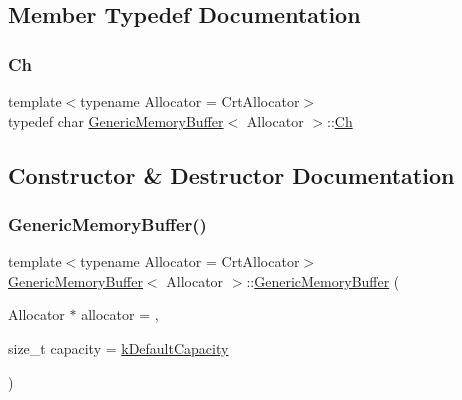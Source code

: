 \subsection{Member Typedef Documentation}
\mbox{\label{structGenericMemoryBuffer_a212f137abfd8bce2ad216b2d960c027f}} 
\subsubsection{\texorpdfstring{Ch}{Ch}}
{\footnotesize\ttfamily template$<$typename Allocator  = Crt\+Allocator$>$ \\
typedef char \hyperlink{structGenericMemoryBuffer}{Generic\+Memory\+Buffer}$<$ Allocator $>$\+::\hyperlink{structGenericMemoryBuffer_a212f137abfd8bce2ad216b2d960c027f}{Ch}}



\subsection{Constructor \& Destructor Documentation}
\mbox{\label{structGenericMemoryBuffer_ad08f7da47bca43fcdb0c3b10e22dfa1d}} 
\subsubsection{\texorpdfstring{Generic\+Memory\+Buffer()}{GenericMemoryBuffer()}}
{\footnotesize\ttfamily template$<$typename Allocator  = Crt\+Allocator$>$ \\
\hyperlink{structGenericMemoryBuffer}{Generic\+Memory\+Buffer}$<$ Allocator $>$\+::\hyperlink{structGenericMemoryBuffer}{Generic\+Memory\+Buffer} (\begin{DoxyParamCaption}\item[{Allocator $\ast$}]{allocator = {},  }\item[{size\+\_\+t}]{capacity = {\ttfamily \hyperlink{structGenericMemoryBuffer_af6ecdbdbb8d3aa53cdef6e788e4980be}{k\+Default\+Capacity}} }\end{DoxyParamCaption})\hspace{0.3cm}{\ttfamily [inline]}}



